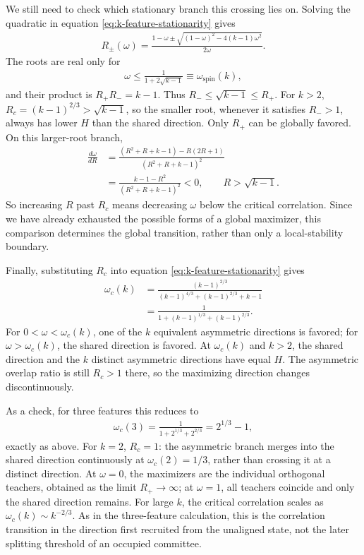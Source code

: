 \documentclass[11pt, reqno]{amsart}
\theoremstyle{notestyle}
\theoremstyle{defstyle}
\begin{document}
We still need to check which stationary branch this crossing lies on.
Solving the quadratic in equation \eqref{eq:k-feature-stationarity} gives
\begin{align*}
    R_\pm(\omega)
    =\frac{1-\omega\pm\sqrt{(1-\omega)^2-4(k-1)\omega^2}}{2\omega}.
\end{align*}
The roots are real only for
\begin{align*}
    \omega\leq\frac{1}{1+2\sqrt{k-1}}
    \equiv\omega_\text{spin}(k),
\end{align*}
and their product is $R_+R_-=k-1$.
Thus $R_-\leq\sqrt{k-1}\leq R_+$.
For $k>2$, $R_c=(k-1)^{2/3}>\sqrt{k-1}$, so the smaller root, whenever it satisfies $R_->1$, always has lower $H$ than the shared direction.
Only $R_+$ can be globally favored.
On this larger-root branch,
\begin{align*}
    \frac{d\omega}{dR}
    &=\frac{(R^2+R+k-1)-R(2R+1)}{(R^2+R+k-1)^2} \\
    &=\frac{k-1-R^2}{(R^2+R+k-1)^2}<0,
    \qquad R>\sqrt{k-1}.
\end{align*}
So increasing $R$ past $R_c$ means decreasing $\omega$ below the critical correlation.
Since we have already exhausted the possible forms of a global maximizer, this comparison determines the global transition, rather than only a local-stability boundary.

Finally, substituting $R_c$ into equation \eqref{eq:k-feature-stationarity} gives
\begin{align}\label{eq:k-feature-omega-critical}
    \omega_c(k)
    &=\frac{(k-1)^{2/3}}{(k-1)^{4/3}+(k-1)^{2/3}+k-1} \\
    &=\boxed{\frac{1}{1+(k-1)^{1/3}+(k-1)^{2/3}}.}
\end{align}
For $0<\omega<\omega_c(k)$, one of the $k$ equivalent asymmetric directions is favored; for $\omega>\omega_c(k)$, the shared direction is favored.
At $\omega_c(k)$ and $k>2$, the shared direction and the $k$ distinct asymmetric directions have equal $H$.
The asymmetric overlap ratio is still $R_c>1$ there, so the maximizing direction changes discontinuously.

As a check, for three features this reduces to
\begin{align*}
    \omega_c(3)
    =\frac{1}{1+2^{1/3}+2^{2/3}}
    =2^{1/3}-1,
\end{align*}
exactly as above.
For $k=2$, $R_c=1$: the asymmetric branch merges into the shared direction continuously at $\omega_c(2)=1/3$, rather than crossing it at a distinct direction.
At $\omega=0$, the maximizers are the individual orthogonal teachers, obtained as the limit $R_+\to\infty$; at $\omega=1$, all teachers coincide and only the shared direction remains.
For large $k$, the critical correlation scales as $\omega_c(k)\sim k^{-2/3}$.
As in the three-feature calculation, this is the correlation transition in the direction first recruited from the unaligned state, not the later splitting threshold of an occupied committee.
\end{document}
